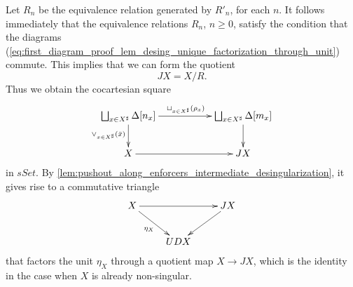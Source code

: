 Let $R_n$ be the equivalence relation generated by $R'_n$, for each $n$. It follows immediately that the equivalence relations $R_n$, $n\geq 0$, satisfy the condition that the diagrams (\ref{eq:first_diagram_proof_lem_desing_unique_factorization_through_unit}) commute. This implies that we can form the quotient
\[JX=X/R.\]
Thus we obtain the cocartesian square
\begin{displaymath}
 \xymatrix{
 \bigsqcup _{x\in X^\sharp}\Delta [n_x] \ar[d]_{\vee _{x\in X^\sharp }(\bar{x} )} \ar[rr]^{\sqcup _{x\in X^\sharp }(\rho _x)} && \bigsqcup _{x\in X^\sharp}\Delta [m_x] \ar[d] \\
 X \ar[rr] && JX
 }
\end{displaymath}
in $sSet$. By \cref{lem:pushout_along_enforcers_intermediate_desingularization}, it gives rise to a commutative triangle
\begin{equation}
\label{eq:first_diagram_description_iterative}
\begin{gathered}
\xymatrix{
X \ar[dr]_{\eta _X} \ar[rr] && JX \ar[ld] \\
& UDX
}
\end{gathered}
\end{equation}
that factors the unit $\eta _X$ through a quotient map $X\to JX$, which is the identity in the case when $X$ is already non-singular.

